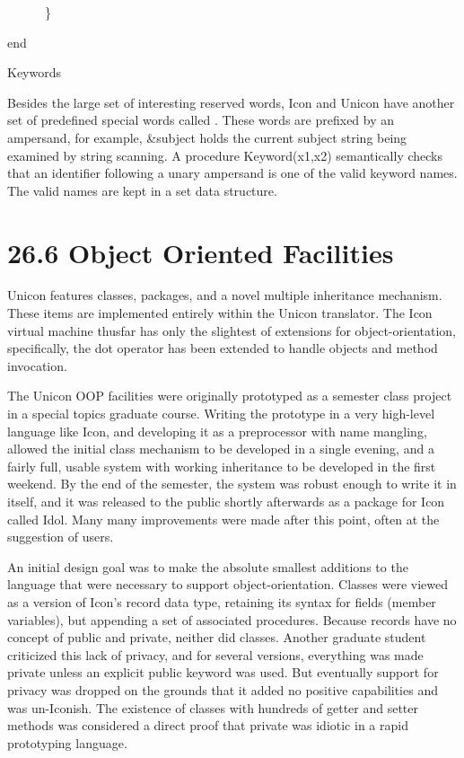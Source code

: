 {\ttfamily\mdseries
\ \ \ \ \ \ \}}

{\ttfamily\mdseries
end}

{\sffamily
Keywords }


Besides the large set of interesting reserved words, Icon and Unicon
have another set of predefined special words called
. These words are prefixed by an
ampersand, for example, \&subject holds the current
{\textquotedbl}subject{\textquotedbl} string being examined by string
scanning. A procedure Keyword(x1,x2) semantically checks that an
identifier following a unary ampersand is one of the valid keyword
names. The valid names are kept in a set data structure.


\section[26.6 Object Oriented Facilities]{26.6 Object Oriented Facilities}

Unicon features classes, packages, and a novel multiple inheritance
mechanism. These items are implemented entirely within the Unicon
translator. The Icon virtual machine thusfar has only the slightest of
extensions for object-orientation, specifically, the dot operator has
been extended to handle objects and method invocation.

The Unicon OOP facilities were originally prototyped as a semester
class project in a {\textquotedbl}special topics{\textquotedbl}
graduate course. Writing the prototype in a very high-level language
like Icon, and developing it as a preprocessor with name mangling,
allowed the initial class mechanism to be developed in a single
evening, and a fairly full, usable system with working inheritance to
be developed in the first weekend. By the end of the semester, the
system was robust enough to write it in itself, and it was released to
the public shortly afterwards as a package for Icon called
{\textquotedbl}Idol{\textquotedbl}. Many many improvements were made
after this point, often at the suggestion of users.

An initial design goal was to make the absolute smallest additions to
the language that were necessary to support
object-orientation. Classes were viewed as a version of Icon's record
data type, retaining its syntax for fields (member variables), but
appending a set of associated procedures. Because records have no
concept of public and private, neither did classes. Another graduate
student criticized this lack of privacy, and for several versions,
everything was made private unless an explicit public keyword was
used. But eventually support for privacy was dropped on the grounds
that it added no positive capabilities and was un-Iconish. The
existence of classes with hundreds of
{\textquotedbl}getter{\textquotedbl} and
{\textquotedbl}setter{\textquotedbl} methods was considered a direct
proof that {\textquotedbl}private{\textquotedbl} was idiotic in a
rapid prototyping language.

